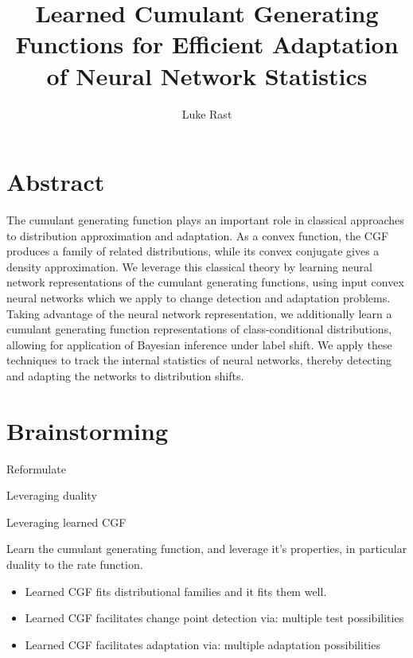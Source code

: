\documentclass[11pt]{article}      %
\begin{document}
\title{Learned Cumulant Generating Functions for Efficient Adaptation of Neural Network Statistics}
\author{Luke Rast}
\maketitle

\doublespacing
\linenumbers


\section{Abstract}

The cumulant generating function plays an important role in classical approaches to distribution approximation and adaptation.
As a convex function, the CGF produces a family of related distributions, while its convex conjugate gives a density approximation.
We leverage this classical theory by learning neural network representations of the cumulant generating functions, using input convex neural networks which we apply to change detection and adaptation problems.
Taking advantage of the neural network representation, we additionally learn a cumulant generating function representations of class-conditional distributions, allowing for application of Bayesian inference under label shift.
We apply these techniques to track the internal statistics of neural networks, thereby detecting and adapting the networks to distribution shifts.



\section{Brainstorming}
Reformulate

Leveraging duality 

Leveraging learned CGF

Learn the cumulant generating function, and leverage it's properties, in particular duality to the rate function.

\begin{itemize}
  \item Learned CGF fits distributional families and it fits them well.
  \item Learned CGF facilitates change point detection via: multiple test possibilities
  \item Learned CGF facilitates adaptation via: multiple adaptation possibilities
\end{itemize}
\end{document}
